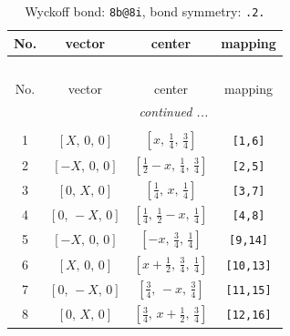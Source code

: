 \documentclass[fleqn,8pt]{jsarticle}
\begin{document}
\renewcommand{\arraystretch}{1.2}
\begin{longtable}{cccc}
\caption{Wyckoff bond: {\tt 8b@8i}, bond symmetry: {\tt .2.}}
 \\
 \hline \hline
No. & vector & center & mapping \\ \hline \endfirsthead

\multicolumn{3}{l}{\tablename\ \thetable{}} \\
 \hline \hline
No. & vector & center & mapping \\ \hline \endhead

 \hline \hline
\multicolumn{3}{r}{\footnotesize\it continued ...} \\ \endfoot

 \hline \hline
\multicolumn{3}{r}{} \\ \endlastfoot

1 & $\left[ X,\, 0,\, 0 \right]$ & $\left[ x,\, \frac{1}{4},\, \frac{3}{4} \right]$ & {\tt [1,6]} \\ \hline
2 & $\left[ - X,\, 0,\, 0 \right]$ & $\left[ \frac{1}{2} - x,\, \frac{1}{4},\, \frac{3}{4} \right]$ & {\tt [2,5]} \\ \hline
3 & $\left[ 0,\, X,\, 0 \right]$ & $\left[ \frac{1}{4},\, x,\, \frac{1}{4} \right]$ & {\tt [3,7]} \\ \hline
4 & $\left[ 0,\, - X,\, 0 \right]$ & $\left[ \frac{1}{4},\, \frac{1}{2} - x,\, \frac{1}{4} \right]$ & {\tt [4,8]} \\ \hline
5 & $\left[ - X,\, 0,\, 0 \right]$ & $\left[ - x,\, \frac{3}{4},\, \frac{1}{4} \right]$ & {\tt [9,14]} \\ \hline
6 & $\left[ X,\, 0,\, 0 \right]$ & $\left[ x + \frac{1}{2},\, \frac{3}{4},\, \frac{1}{4} \right]$ & {\tt [10,13]} \\ \hline
7 & $\left[ 0,\, - X,\, 0 \right]$ & $\left[ \frac{3}{4},\, - x,\, \frac{3}{4} \right]$ & {\tt [11,15]} \\ \hline
8 & $\left[ 0,\, X,\, 0 \right]$ & $\left[ \frac{3}{4},\, x + \frac{1}{2},\, \frac{3}{4} \right]$ & {\tt [12,16]} \\
\end{longtable}
\renewcommand{\arraystretch}{1.2}
\end{document}
